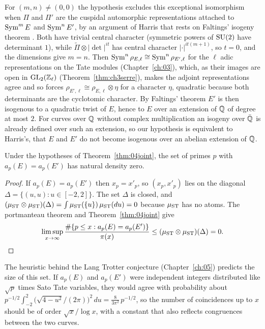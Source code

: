 For $(m,n)\ne(0,0)$ the hypothesis excludes this exceptional isomorphism when $\Pi$ and $\Pi'$ are the cuspidal automorphic representations attached to $\operatorname{Sym}^m E$ and $\operatorname{Sym}^n E'$, by an argument of Harris that rests on Faltings' isogeny theorem \cite{faltings1983}. Both have trivial central character (symmetric powers of $\mathrm{SU}(2)$ have determinant $1$), while $\tilde\Pi\otimes|\det|^{it}$ has central character $|\cdot|^{it(m+1)}$, so $t = 0$, and the dimensions give $m = n$. Then $\operatorname{Sym}^n\rho_{E,\ell}\cong\operatorname{Sym}^n\rho_{E',\ell}$ for the $\ell$ adic representations on the Tate modules (Chapter~\ref{ch:03}), which, as their images are open in $\mathrm{GL}_2(\mathbb{Z}_\ell)$ (Theorem~\ref{thm:ch3serre}), makes the adjoint representations agree and so forces $\rho_{E',\ell}\cong\rho_{E,\ell}\otimes\eta$ for a character $\eta$, quadratic because both determinants are the cyclotomic character. By Faltings' theorem $E'$ is then isogenous to a quadratic twist of $E$, hence to $E$ over an extension of $\mathbb{Q}$ of degree at most $2$. For curves over $\mathbb{Q}$ without complex multiplication an isogeny over $\bar{\mathbb{Q}}$ is already defined over such an extension, so our hypothesis is equivalent to Harris's, that $E$ and $E'$ do not become isogenous over an abelian extension of $\mathbb{Q}$.

\begin{corollary}\label{cor:04coinc}
Under the hypotheses of Theorem~\ref{thm:04joint}, the set of primes $p$ with $a_p(E) = a_p(E')$ has natural density zero.
\end{corollary}

\begin{proof}
If $a_p(E) = a_p(E')$ then $x_p = x'_p$, so $(x_p, x'_p)$ lies on the diagonal $\Delta = \{(u,u) : u \in [-2,2]\}$. The set $\Delta$ is closed, and $(\mu_{\mathrm{ST}}\otimes\mu_{\mathrm{ST}})(\Delta) = \int \mu_{\mathrm{ST}}(\{u\})\,\mu_{\mathrm{ST}}(du) = 0$ because $\mu_{\mathrm{ST}}$ has no atoms. The portmanteau theorem and Theorem~\ref{thm:04joint} give
\[
\limsup_{x\to\infty}\frac{\#\{p\le x: a_p(E) = a_p(E')\}}{\pi(x)} \le (\mu_{\mathrm{ST}}\otimes\mu_{\mathrm{ST}})(\Delta) = 0. \qedhere
\]
\end{proof}

The heuristic behind the Lang Trotter conjecture (Chapter~\ref{ch:05}) predicts the size of this set. If $a_p(E)$ and $a_p(E')$ were independent integers distributed like $\sqrt p$ times Sato Tate variables, they would agree with probability about $p^{-1/2}\int_{-2}^2 \bigl(\sqrt{4-u^2}/(2\pi)\bigr)^2\,du = \frac{8}{3\pi^2}\,p^{-1/2}$, so the number of coincidences up to $x$ should be of order $\sqrt x/\log x$, with a constant that also reflects congruences between the two curves.


